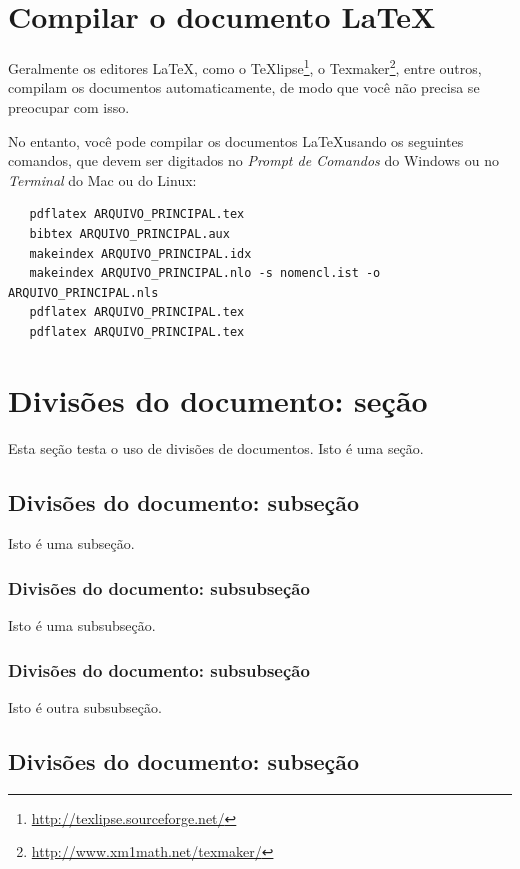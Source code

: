 \section{Compilar o documento \LaTeX}

Geralmente os editores \LaTeX, como o
TeXlipse\footnote{\url{http://texlipse.sourceforge.net/}}, o
Texmaker\footnote{\url{http://www.xm1math.net/texmaker/}}, entre outros,
compilam os documentos automaticamente, de modo que você não precisa se
preocupar com isso.

No entanto, você pode compilar os documentos \LaTeX usando os seguintes
comandos, que devem ser digitados no \emph{Prompt de Comandos} do Windows ou no
\emph{Terminal} do Mac ou do Linux:

\begin{verbatim}
   pdflatex ARQUIVO_PRINCIPAL.tex
   bibtex ARQUIVO_PRINCIPAL.aux
   makeindex ARQUIVO_PRINCIPAL.idx 
   makeindex ARQUIVO_PRINCIPAL.nlo -s nomencl.ist -o ARQUIVO_PRINCIPAL.nls
   pdflatex ARQUIVO_PRINCIPAL.tex
   pdflatex ARQUIVO_PRINCIPAL.tex
\end{verbatim}

\section{Divisões do documento: seção}\label{sec-divisoes}

Esta seção testa o uso de divisões de documentos. Isto é uma seção.

\subsection{Divisões do documento: subseção}

Isto é uma subseção.

\subsubsection{Divisões do documento: subsubseção}

Isto é uma subsubseção.

\subsubsection{Divisões do documento: subsubseção}

Isto é outra subsubseção.

\subsection{Divisões do documento: subseção}\label{sec-exemplo-subsec}

